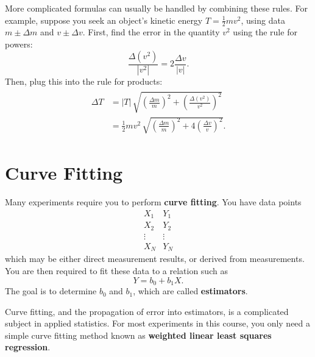 \documentclass[11pt,a4paper]{article}
\begin{document}
More complicated formulas can usually be handled by combining these
rules.  For example, suppose you seek an object's kinetic energy $T =
\frac{1}{2}mv^2$, using data $m \pm \Delta m$ and $v \pm \Delta v$.
First, find the error in the quantity $v^2$ using the rule for powers:
\begin{equation*}
  \frac{\Delta (v^2)}{|v^2|} = 2 \frac{\Delta v}{|v|}.
\end{equation*}
Then, plug this into the rule for products:
\begin{align}
  \begin{aligned}
    \Delta T &= |T|\, \sqrt{\left(\frac{\Delta m}{m}\right)^2
      + \left(\frac{\Delta (v^2)}{v^2}\right)^2} \\
    &= \frac{1}{2} m v^2\, \sqrt{\left(\frac{\Delta m}{m}\right)^2
      + 4 \left(\frac{\Delta v}{v}\right)^2}.
  \end{aligned} \nonumber
\end{align}

\section{Curve Fitting}
\label{sec:curvefit}

Many experiments require you to perform \textbf{curve fitting}.  You
have data points
\begin{equation*}
  \begin{array}{c}X_1 \\ X_2 \\ \vdots \\ X_N \end{array}
  \begin{array}{c}Y_1 \\ Y_2 \\ \vdots \\ Y_N \end{array}
\end{equation*}
which may be either direct measurement results, or derived from
measurements.  You are then required to fit these data to a relation
such as
\begin{equation*}
  Y = b_0 + b_1 X.
\end{equation*}
The goal is to determine $b_0$ and $b_1$, which are called
\textbf{estimators}.

Curve fitting, and the propagation of error into estimators, is a
complicated subject in applied statistics.  For most experiments in
this course, you only need a simple curve fitting method known as
\textbf{weighted linear least squares regression}.
\end{document}
